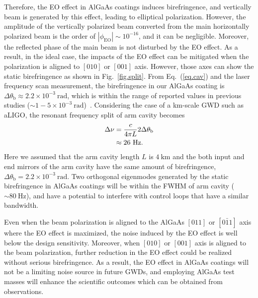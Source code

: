 \documentclass[%
 reprint,
 superscriptaddress,
 amsmath,amssymb,
 aps,
]{revtex4-2}
\newcommand{\unit}[1]{\ \mathrm{#1}}
\begin{document}
Therefore, the EO effect in AlGaAs coatings induces birefringence, and vertically beam is generated by this effect, leading to elliptical polarization.
However, the amplitude of the vertically polarized beam converted from the main horizontally polarized beam is the order of $|\phi_{\mathrm{EO}}|\sim10^{-16}$, and it can be negligible.
Moreover, the reflected phase of the main beam is not disturbed by the EO effect.
As a result, in the ideal case, the impacts of the EO effect can be mitigated when the polarization is aligned to $[010]$ or $[001]$ axis.
However, those axes can show the static birefringence as shown in Fig.~\ref{fig.split}.
From Eq.~(\ref{eq.cav}) and the laser frequency scan measurement, the birefringence in our AlGaAs coating is $\Delta\theta_{\mathrm{b}}\approx2.2\times10^{-3}\unit{rad}$, which is within the range of reported values in previous studies ($\sim1-5\times10^{-3}\unit{rad}$)~\cite{Cole2013, Cole2016}.
Considering the case of a km-scale GWD such as aLIGO, the resonant frequency split of arm cavity becomes
\begin{align}
    \Delta\nu &= \frac{c}{4\pi L}2\Delta\theta_{\mathrm{b}} \notag \\
    &\approx 26\unit{Hz}.
\end{align}
Here we assumed that the arm cavity length $L$ is $4\unit{km}$ and the both input and end mirrors of the arm cavity have the same amount of birefringence, $\Delta\theta_{\mathrm{b}}=2.2\times10^{-3}\unit{rad}$.
Two orthogonal eigenmodes generated by the static birefringence in AlGaAs coatings will be within the FWHM of arm cavity ($\sim80\unit{Hz}$), and have a potential to interfere with control loops that have a similar bandwidth.

Even when the beam polarization is aligned to the AlGaAs $[011]$ or $[0\bar{1}1]$ axis where the EO effect is maximized, the noise induced by the EO effect is well below the design sensitivity.
Moreover, when $[010]$ or $[001]$ axis is aligned to the beam polarization, further reduction in the EO effect could be realized without serious birefringence.
As a result, the EO effect in AlGaAs coatings will not be a limiting noise source in future GWDs, and employing AlGaAs test masses will enhance the scientific outcomes which can be obtained from observations.
\end{document}
